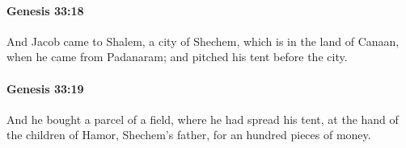 		\paragraph{Genesis 33:18} %
			\label{GENESIS-33-18}

			And Jacob came to Shalem, a city of Shechem, which is in the land of Canaan, when he came from Padanaram; and pitched his tent before the city.


		\paragraph{Genesis 33:19} %
			\label{GENESIS-33-19}

			And he bought a parcel of a field, where he had spread his tent, at the hand of the children of Hamor, Shechem's father, for an hundred pieces of money.



